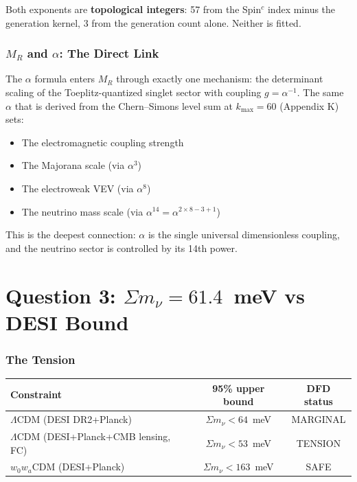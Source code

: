 \documentclass[11pt,a4paper]{article}
\begin{document}
Both exponents are \textbf{topological integers}: 57 from the Spin$^c$ index
minus the generation kernel, 3 from the generation count alone. Neither is
fitted.

\section{$M_R$ and $\alpha$: The Direct Link}

The $\alpha$ formula enters $M_R$ through exactly one mechanism: the
determinant scaling of the Toeplitz-quantized singlet sector with coupling
$g = \alpha^{-1}$. The same $\alpha$ that is derived from the Chern--Simons
level sum at $k_{\max} = 60$ (Appendix K) sets:
\begin{itemize}
\item The electromagnetic coupling strength
\item The Majorana scale (via $\alpha^3$)
\item The electroweak VEV (via $\alpha^8$)
\item The neutrino mass scale (via $\alpha^{14} = \alpha^{2 \times 8 - 3 + 1}$)
\end{itemize}

This is the deepest connection: $\alpha$ is the single universal
dimensionless coupling, and the neutrino sector is controlled by its 14th
power.


\part{Question 3: $\Sigma m_\nu = 61.4$~meV vs DESI Bound}

\section{The Tension}

\begin{center}
\begin{tabular}{lcc}
\toprule
Constraint & 95\% upper bound & DFD status \\
\midrule
$\Lambda$CDM (DESI DR2+Planck) & $\Sigma m_\nu < 64$~meV & MARGINAL \\
$\Lambda$CDM (DESI+Planck+CMB lensing, FC) & $\Sigma m_\nu < 53$~meV &
  TENSION \\
$w_0 w_a$CDM (DESI+Planck) & $\Sigma m_\nu < 163$~meV & SAFE \\
\bottomrule
\end{tabular}
\end{center}
\end{document}
